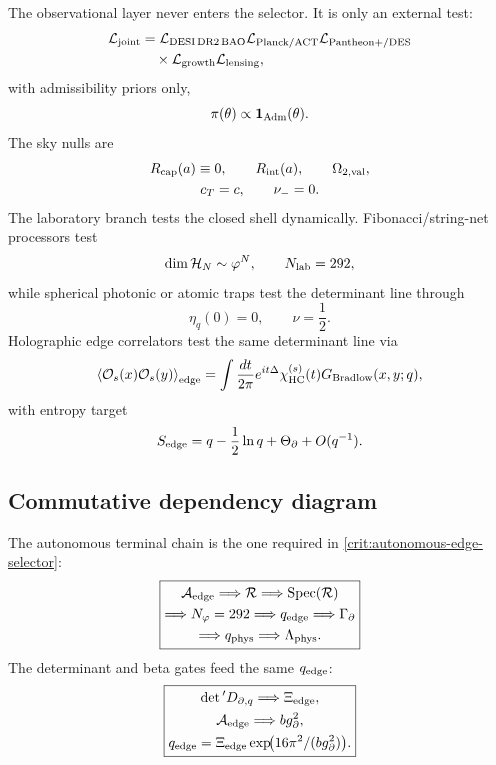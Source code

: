 \documentclass[aps,prd,reprint,nofootinbib,superscriptaddress,floatfix]{revtex4-2}
\numberwithin{equation}{section}
\theoremstyle{definition}
\theoremstyle{plain}
\begin{document}
The observational layer never enters the selector.  It is only an external
test:
\[
\begin{aligned}
\mathcal L_{\rm joint}
&=
\mathcal L_{\rm DESI\,DR2\,BAO}
\mathcal L_{\rm Planck/ACT}
\mathcal L_{\rm Pantheon+/DES}\\
&\quad\times
\mathcal L_{\rm growth}
\mathcal L_{\rm lensing},
\end{aligned}
\]
with admissibility priors only,
\[
\pi(\theta)\propto\mathbf 1_{\rm Adm}(\theta).
\]
The sky nulls are
\[
\begin{gathered}
R_{\rm cap}(a)\equiv0,\qquad
R_{\rm int}(a),\qquad
\Omega_{2,{\rm val}},\\
c_T=c,\qquad
\nu_-=0.
\end{gathered}
\]
The laboratory branch tests the closed shell dynamically.  Fibonacci/string-net
processors test
\[
\dim\mathcal H_N\sim\varphi^N,
\qquad
N_{\rm lab}=292,
\]
while spherical photonic or atomic traps test the determinant line through
\[
\eta_q(0)=0,\qquad \nu=\frac12.
\]
Holographic edge correlators test the same determinant line via
\[
\left\langle
\mathcal O_s(x)\mathcal O_s(y)
\right\rangle_{\rm edge}
=
\int\frac{dt}{2\pi}
e^{it\Delta}
\chi_{\rm HC}^{(s)}(t)
G_{\rm Bradlow}(x,y;q),
\]
with entropy target
\[
S_{\rm edge}=q-\frac12\ln q+\Theta_\partial+O(q^{-1}).
\]

\subsection{Commutative dependency diagram}

The autonomous terminal chain is the one required in
\cref{crit:autonomous-edge-selector}:
\[
\boxed{
\begin{gathered}
\mathcal A_{\rm edge}\Longrightarrow\mathcal R
\Longrightarrow\operatorname{Spec}(\mathcal R)\\
\Longrightarrow N_\varphi=292
\Longrightarrow q_{\rm edge}
\Longrightarrow\Gamma_\partial\\
\Longrightarrow q_{\rm phys}
\Longrightarrow\Lambda_{\rm phys}.
\end{gathered}
}
\]
The determinant and beta gates feed the same \(q_{\rm edge}\):
\[
\boxed{
\begin{gathered}
\det{}'D_{\partial,q}\Longrightarrow\Xi_{\rm edge},\\
\mathcal A_{\rm edge}\Longrightarrow b g_\partial^2,\\
q_{\rm edge}
=
\Xi_{\rm edge}
\exp\!\bigl(16\pi^2/(b g_\partial^2)\bigr).
\end{gathered}
}
\]
\end{document}

